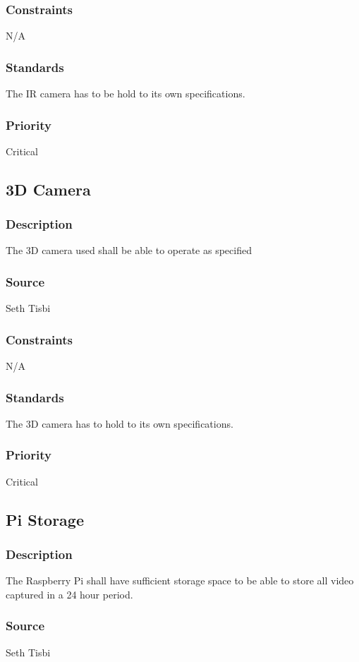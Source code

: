 \subsubsection{Constraints}
N/A
\subsubsection{Standards}
The IR camera has to be hold to its own specifications.
\subsubsection{Priority}
Critical

\subsection{3D Camera}
\subsubsection{Description}
The 3D camera used shall be able to operate as specified
\subsubsection{Source}
Seth Tisbi
\subsubsection{Constraints}
N/A
\subsubsection{Standards}
The 3D camera has to hold to its own specifications.
\subsubsection{Priority}
Critical

\subsection{Pi Storage}
\subsubsection{Description}
The Raspberry Pi shall have sufficient storage space to be able to store all video captured in a 24 hour period.
\subsubsection{Source}
Seth Tisbi
